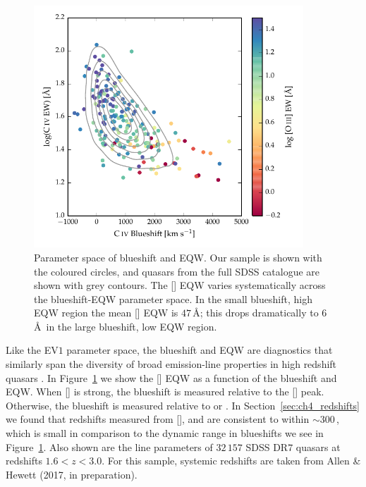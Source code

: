 \begin{figure}[t!]
\centering 
    \includegraphics[width=0.9\textwidth]{figures/chapter04/ev1.pdf} 
    \caption[{Parameter space of  blueshift and EQW.}]{Parameter space of  blueshift and EQW. Our sample is shown with the coloured circles, and quasars from the full SDSS catalogue are shown with grey contours. The [] EQW varies systematically across the  blueshift-EQW parameter space. In the small  blueshift, high EQW region the mean [] EQW is $47$\,\AA; this drops dramatically to $6$\AA\, in the large  blueshift, low EQW region.}      
    \label{fig:ev1}
\end{figure}

Like the EV$1$ parameter space, the  blueshift and EQW are diagnostics that similarly span the diversity of broad emission-line properties in high redshift quasars \citep{sulentic07,richards11}. 
In Figure~\ref{fig:ev1} we show the [] EQW as a function of the  blueshift and EQW.
When [] is strong, the  blueshift is measured relative to the [] peak. 
Otherwise, the  blueshift is measured relative to \hb or \hans.  
In Section~\ref{sec:ch4_redshifts} we found that redshifts measured from [], \hb and \ha are consistent to within $\sim300$\,\kms, which is small in comparison to the dynamic range in  blueshifts we see in Figure~\ref{fig:ev1}.
Also shown are the  line parameters of $32\,157$ SDSS DR$7$ quasars at redshifts $1.6 < z < 3.0$. 
For this sample, systemic redshifts are taken from Allen \& Hewett (2017, in preparation). 

